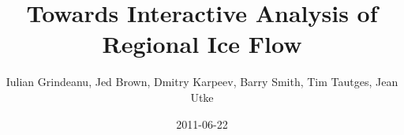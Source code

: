 \documentclass{beamer}
\title{Towards Interactive Analysis of Regional Ice Flow}
\author{Iulian Grindeanu, Jed Brown, Dmitry Karpeev, Barry Smith, Tim Tautges, Jean Utke}
\institute[ANL]
{
  Argonne National Laboratory
}
\date{2011-06-22}
\begin{document}
\lstset{language=C}
\normalem

\begin{frame}
\titlepage
\end{frame}




\end{document}
